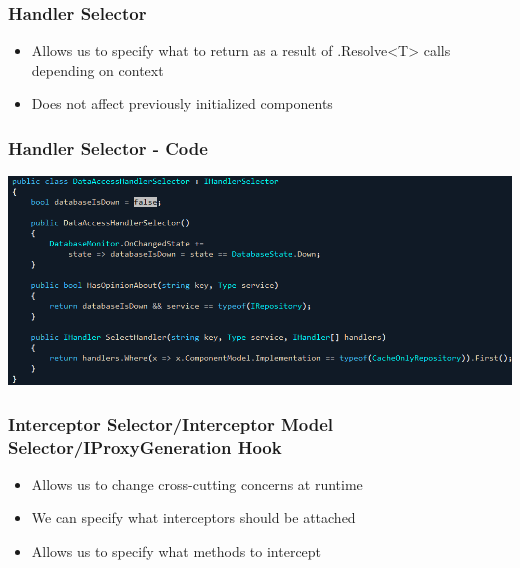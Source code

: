 \documentclass[turkish]{beamer}
\begin{document}
				\frame
				{	
					\frametitle{Handler Selector}
			  	\begin{itemize}
			  		\item<1->Allows us to specify what to return as a result of .Resolve<T> calls depending on context 
			  		\item<2->Does not affect previously initialized components
			  	\end{itemize}
			 }
			 	\frame
				{
					\frametitle{Handler Selector - Code}
					\begin{center}
						\includegraphics[scale=0.40]{images/handlerselector.png}
					\end{center}
	    	 }
	    	\frame
				{
					\frametitle{Interceptor Selector/Interceptor Model Selector/IProxyGeneration Hook}
			  	\begin{itemize}
			  	  \item<1->Allows us to change cross-cutting concerns at runtime
			  		\item<2->We can specify what interceptors should be attached
			  		\item<3->Allows us to specify what methods to intercept
			  	\end{itemize}
			 }
\end{document}
